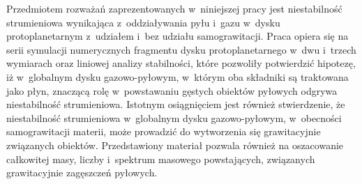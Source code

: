 
Przedmiotem rozważań zaprezentowanych w~niniejszej pracy jest niestabilność
stru\-mie\-nio\-wa wynikająca z~oddziaływania pyłu i~gazu w~dysku
protoplanetarnym z~udziałem i~bez udziału samograwitacji. Praca opiera się na
serii symulacji numerycznych fragmentu dysku protoplanetarnego w~dwu i~trzech
wymiarach oraz liniowej analizy stabilności, które pozwoliły potwierdzić
hipotezę, iż w~globalnym dysku gazowo-pyłowym, w~którym oba składniki są
traktowana jako płyn, znaczącą rolę w~powstawaniu gęstych obiektów pyłowych
odgrywa niestabilność strumieniowa. Istotnym osiągnięciem jest również
stwierdzenie, że niestabilność strumieniowa w~globalnym dysku gazowo-pyłowym,
w~obecności samograwitacji materii, może prowadzić do wytworzenia się
grawitacyjnie związanych obiektów.  Przedstawiony materiał pozwala również na
oszacowanie całkowitej masy, liczby i~spektrum masowego powstających, związanych
grawitacyjnie zagęszczeń pyłowych.


